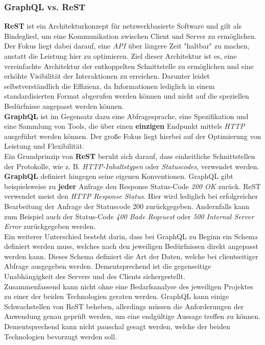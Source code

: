 \documentclass[10pt,journal,compsoc]{IEEEtran}
\begin{document}
\subsubsection{GraphQL vs. ReST}
\textbf{ReST} ist ein Architekturkonzept für netzwerkbasierte Software und gilt als Bindeglied, um eine Kommunikation zwischen Client und Server zu ermöglichen. Der Fokus liegt dabei darauf, eine \textit{API} über längere Zeit "haltbar" zu machen, anstatt die Leistung hier zu optimieren. Ziel dieser Architektur ist es, eine vereinfachte Architektur der entkoppelten Schnittstelle zu ermöglichen und eine erhöhte Visibilität der Interaktionen zu erreichen. Darunter leidet selbstverständlich die Effizienz, da Informationen lediglich in einem standardisierten Format abgerufen werden können und nicht auf die speziellen Bedürfnisse angepasst werden können. \cite{GraphQL: ReST} \\
\textbf{GraphQL} ist im Gegensatz dazu eine Abfragesprache, eine Spezifikation und eine Sammlung von Tools, die über einen \textbf{einzigen} Endpunkt mittels \textit{HTTP} ausgeführt werden können. Der große Fokus liegt hierbei auf der Optimierung von Leistung und Flexibilität.\\
Ein Grundprinzip von \textbf{ReST} beruht sich darauf, dass einheitliche Schnittstellen der Protokolle, wie z. B. \textit{HTTP-Inhaltstypen} oder \textit{Statuscodes}, verwendet werden. \textbf{GraphQL} definiert hingegen seine eigenen Konventionen. GraphQL gibt beispielsweise zu \textbf{jeder} Anfrage den Response Status-Code \textit{200 OK} zurück. ReST verwendet meist den \textit{HTTP Response Status}. Hier wird lediglich bei erfolgreicher Bearbeitung der Anfrage der Statuscode 200 zurückgegeben. Andernfalls kann zum Beispiel auch der Status-Code \textit{400 Bade Reqeuest} oder \textit{500 Internal Server Error} zurückgegeben werden. \cite{GraphQL: ReST} \\
Ein weiterer Unterschied besteht darin, dass bei GraphQL zu Beginn ein Schema definiert werden muss, welches nach den jeweiligen Bedürfnissen direkt angepasst werden kann. Dieses Schema definiert die Art der Daten, welche bei clientseitiger Abfrage ausgegeben werden. Dementsprechend ist die gegenseitige Unabhängigkeit des Servers und des Clients sichergestellt. \\
Zusammenfassend kann nicht ohne eine Bedarfsanalyse des jeweiligen Projektes zu einer der beiden Technologien geraten werden. GraphQL kann einige Schwachstellen von ReST beheben, allerdings müssen die Anforderungen der Anwendung genau geprüft werden, um eine endgültige Aussage treffen zu können. Dementsprechend kann nicht pauschal gesagt werden, welche der beiden Technologien bevorzugt werden soll.\cite{ReST: GraphQL}
\end{document}
